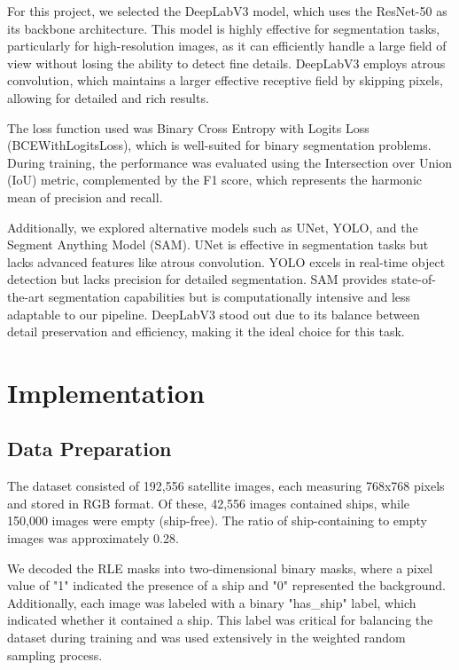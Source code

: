 \documentclass{article}
\begin{document}
For this project, we selected the DeepLabV3 model, which uses the ResNet-50 as its backbone architecture. This model is highly effective for segmentation tasks, particularly for high-resolution images, as it can efficiently handle a large field of view without losing the ability to detect fine details. DeepLabV3 employs atrous convolution, which maintains a larger effective receptive field by skipping pixels, allowing for detailed and rich results.

The loss function used was Binary Cross Entropy with Logits Loss (BCEWithLogitsLoss), which is well-suited for binary segmentation problems. During training, the performance was evaluated using the Intersection over Union (IoU) metric, complemented by the F1 score, which represents the harmonic mean of precision and recall.

Additionally, we explored alternative models such as UNet, YOLO, and the Segment Anything Model (SAM). UNet is effective in segmentation tasks but lacks advanced features like atrous convolution. YOLO excels in real-time object detection but lacks precision for detailed segmentation. SAM provides state-of-the-art segmentation capabilities but is computationally intensive and less adaptable to our pipeline. DeepLabV3 stood out due to its balance between detail preservation and efficiency, making it the ideal choice for this task.

\section{Implementation}

\subsection{Data Preparation}

The dataset consisted of 192,556 satellite images, each measuring 768x768 pixels and stored in RGB format. Of these, 42,556 images contained ships, while 150,000 images were empty (ship-free). The ratio of ship-containing to empty images was approximately 0.28.

We decoded the RLE masks into two-dimensional binary masks, where a pixel value of "1" indicated the presence of a ship and "0" represented the background. Additionally, each image was labeled with a binary "has\_ship" label, which indicated whether it contained a ship. This label was critical for balancing the dataset during training and was used extensively in the weighted random sampling process.
\end{document}
